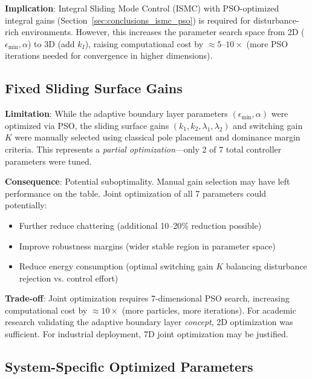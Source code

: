 \textbf{Implication}: Integral Sliding Mode Control (ISMC) with PSO-optimized integral gains (Section~\ref{sec:conclusions_ismc_pso}) is required for disturbance-rich environments. However, this increases the parameter search space from 2D ($\epsilon_{\min}, \alpha$) to 3D (add $k_I$), raising computational cost by $\approx 5$--$10\times$ (more PSO iterations needed for convergence in higher dimensions).

\subsection{Fixed Sliding Surface Gains}
\label{subsec:limitation_fixed_gains}

\textbf{Limitation}: While the adaptive boundary layer parameters $(\epsilon_{\min}, \alpha)$ were optimized via PSO, the sliding surface gains $(k_1, k_2, \lambda_1, \lambda_2)$ and switching gain $K$ were manually selected using classical pole placement and dominance margin criteria. This represents a \textit{partial optimization}—only 2 of 7 total controller parameters were tuned.

\textbf{Consequence}: Potential suboptimality. Manual gain selection may have left performance on the table. Joint optimization of all 7 parameters could potentially:
\begin{itemize}
    \item Further reduce chattering (additional 10--20\% reduction possible)
    \item Improve robustness margins (wider stable region in parameter space)
    \item Reduce energy consumption (optimal switching gain $K$ balancing disturbance rejection vs. control effort)
\end{itemize}

\textbf{Trade-off}: Joint optimization requires 7-dimensional PSO search, increasing computational cost by $\approx 10\times$ (more particles, more iterations). For academic research validating the adaptive boundary layer \textit{concept}, 2D optimization was sufficient. For industrial deployment, 7D joint optimization may be justified.

\subsection{System-Specific Optimized Parameters}
\label{subsec:limitation_system_specific}

